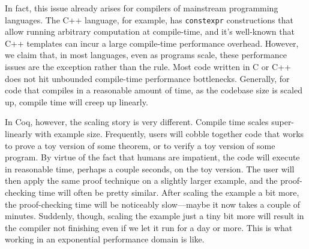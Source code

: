 In fact, this issue already arises for compilers of mainstream programming languages.
The C++ language, for example, has \texttt{constexpr} constructions that allow running arbitrary computation at compile-time, and it's well-known that C++ templates can incur a large compile-time performance overhead.
However, we claim that, in most languages, even as programs scale, these performance issues are the exception rather than the rule.
Most code written in C or C++ does not hit unbounded compile-time performance bottlenecks.
Generally, for code that compiles in a reasonable amount of time, as the codebase size is scaled up, compile time will creep up linearly.

In Coq, however, the scaling story is very different.
Compile time scales super-linearly with example size.
Frequently, users will cobble together code that works to prove a toy version of some theorem, or to verify a toy version of some program.
By virtue of the fact that humans are impatient, the code will execute in reasonable time, perhaps a couple seconds, on the toy version.
The user will then apply the same proof technique on a slightly larger example, and the proof-checking time will often be pretty similar.
After scaling the example a bit more, the proof-checking time will be noticeably slow---maybe it now takes a couple of minutes.
Suddenly, though, scaling the example just a tiny bit more will result in the compiler not finishing even if we let it run for a day or more.
This is what working in an exponential performance domain is like.

